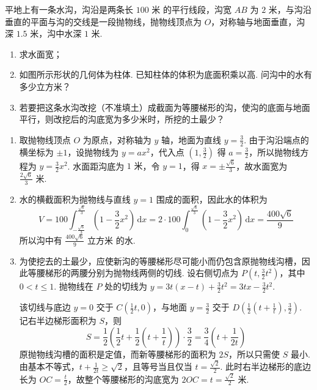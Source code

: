 \documentclass[UTF8,a4paper,oneside,11pt]{ctexbook}
\begin{document}
\begin{problem}
平地上有一条水沟，沟沿是两条长 \(100\text{ 米}\) 的平行线段，沟宽 \(AB\) 为 \(2\text{ 米}\)，与沟沿垂直的平面与沟的交线是一段抛物线，抛物线顶点为 \(O\)，对称轴与地面垂直，沟深 \(1.5\text{ 米}\)，沟中水深 \(1\text{ 米}\).

\begin{enumerate}
\item 求水面宽；
\item 如图所示形状的几何体为柱体. 已知柱体的体积为底面积乘以高. 问沟中的水有多少立方米？
\item 若要把这条水沟改挖（不准填土）成截面为等腰梯形的沟，使沟的底面与地面平行，则改挖后的沟底宽为多少米时，所挖的土最少？
\end{enumerate}

\end{problem}

\begin{solution}
\begin{enumerate}
\item 取抛物线顶点 \(O\) 为原点，对称轴为 \(y\) 轴，地面为直线 \(y=\frac32\). 由于沟沿端点的横坐标为 \(\pm1\)，设抛物线为 \(y=ax^2\)，代入点 \(\left(1,\frac32\right)\) 得 \(a=\frac32\)，所以抛物线方程为 \(y=\frac32x^2\). 水面距沟底为 \(1\text{ 米}\)，令 \(y=1\)，得 \(x=\pm\frac{\sqrt6}{3}\)，故水面宽为 \(\frac{2\sqrt6}{3}\text{ 米}\).

\item 水的横截面积为抛物线与直线 \(y=1\) 围成的面积，因此水的体积为
\[
V=100\int_{-\frac{\sqrt6}{3}}^{\frac{\sqrt6}{3}}\left(1-\frac32x^2\right)\,\mathrm dx=2\cdot100\int_0^{\frac{\sqrt6}{3}}\left(1-\frac32x^2\right)\,\mathrm dx=\frac{400\sqrt6}{9}
\]
所以沟中有 \(\frac{400\sqrt6}{9}\text{ 立方米}\) 的水.

\item 为使挖去的土最少，应使新沟的等腰梯形尽可能小而仍包含原抛物线沟槽，因此等腰梯形的两腰分别为抛物线两侧的切线. 设右侧切点为 \(P\left(t,\frac32t^2\right)\)，其中 \(0<t\leq1\). 抛物线在 \(P\) 处的切线为
\(y=3t(x-t)+\frac32t^2=3tx-\frac32t^2\).

该切线与底边 \(y=0\) 交于 \(C\left(\frac12t,0\right)\)，与地面 \(y=\frac32\) 交于 \(D\left(\frac12\left(t+\frac1t\right),\frac32\right)\). 记右半边梯形面积为 \(S\)，则
\[
S=\frac12\left(\frac12t+\frac12\left(t+\frac1t\right)\right)\cdot\frac32=\frac34\left(t+\frac1{2t}\right)
\]
原抛物线沟槽的面积是定值，而新等腰梯形的面积为 \(2S\)，所以只需使 \(S\) 最小. 由基本不等式，\(t+\frac1{2t}\geq\sqrt2\)，且等号当且仅当 \(t=\frac{\sqrt2}{2}\). 此时右半边梯形的底边长为 \(OC=\frac{t}{2}\)，故整个等腰梯形的沟底宽为 \(2OC=t=\frac{\sqrt2}{2}\text{ 米}\).
\end{enumerate}
\end{solution}
\end{document}
